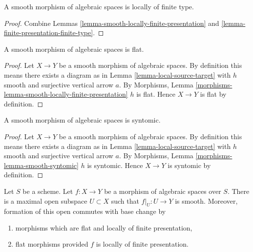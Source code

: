 \begin{lemma}
\label{lemma-smooth-locally-finite-type}
A smooth morphism of algebraic spaces is locally of finite type.
\end{lemma}

\begin{proof}
Combine
Lemmas \ref{lemma-smooth-locally-finite-presentation} and
\ref{lemma-finite-presentation-finite-type}.
\end{proof}

\begin{lemma}
\label{lemma-smooth-flat}
A smooth morphism of algebraic spaces is flat.
\end{lemma}

\begin{proof}
Let $X \to Y$ be a smooth morphism of algebraic spaces. By
definition this means there exists a diagram as in
Lemma \ref{lemma-local-source-target}
with $h$ smooth and surjective vertical arrow $a$. By
Morphisms, Lemma \ref{morphisms-lemma-smooth-locally-finite-presentation}
$h$ is flat. Hence $X \to Y$ is flat by definition.
\end{proof}

\begin{lemma}
\label{lemma-smooth-syntomic}
A smooth morphism of algebraic spaces is syntomic.
\end{lemma}

\begin{proof}
Let $X \to Y$ be a smooth morphism of algebraic spaces. By
definition this means there exists a diagram as in
Lemma \ref{lemma-local-source-target}
with $h$ smooth and surjective vertical arrow $a$. By
Morphisms, Lemma \ref{morphisms-lemma-smooth-syntomic}
$h$ is syntomic. Hence $X \to Y$ is syntomic by definition.
\end{proof}

\begin{lemma}
\label{lemma-where-smooth}
Let $S$ be a scheme. Let $f : X \to Y$ be a morphism of algebraic
spaces over $S$. There is a maximal open subspace $U \subset X$
such that $f|_U : U \to Y$ is smooth. Moreover, formation of
this open commutes with base change by
\begin{enumerate}
\item morphisms which are flat and
locally of finite presentation,
\item flat morphisms provided $f$ is locally of finite presentation.
\end{enumerate}
\end{lemma}

